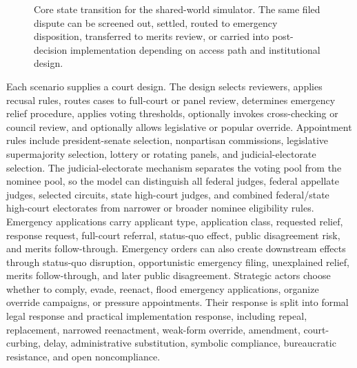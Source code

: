 \documentclass[
    journal=jlc,
    manuscript=research-article,
    year=2026,
  ]{cup-journal}
\providecommand{\Description}[1]{}
\begin{document}
\begin{figure}[hbt!]
\centering
{}
\caption{Core state transition for the shared-world simulator. The same filed dispute can be screened out, settled, routed to emergency disposition, transferred to merits review, or carried into post-decision implementation depending on access path and institutional design.}
\Description{Flow diagram showing filed dispute, access path, admission screen, emergency or merits route, decision, formal response, practical implementation, and compliance/conflict/legitimacy outputs.}
\label{fig:model-flow}
\end{figure}

Each scenario supplies a court design. The design selects reviewers, applies recusal rules, routes cases to full-court or panel review, determines emergency relief procedure, applies voting thresholds, optionally invokes cross-checking or council review, and optionally allows legislative or popular override. Appointment rules include president-senate selection, nonpartisan commissions, legislative supermajority selection, lottery or rotating panels, and judicial-electorate selection. The judicial-electorate mechanism separates the voting pool from the nominee pool, so the model can distinguish all federal judges, federal appellate judges, selected circuits, state high-court judges, and combined federal/state high-court electorates from narrower or broader nominee eligibility rules. Emergency applications carry applicant type, application class, requested relief, response request, full-court referral, status-quo effect, public disagreement risk, and merits follow-through. Emergency orders can also create downstream effects through status-quo disruption, opportunistic emergency filing, unexplained relief, merits follow-through, and later public disagreement. Strategic actors choose whether to comply, evade, reenact, flood emergency applications, organize override campaigns, or pressure appointments. Their response is split into formal legal response and practical implementation response, including repeal, replacement, narrowed reenactment, weak-form override, amendment, court-curbing, delay, administrative substitution, symbolic compliance, bureaucratic resistance, and open noncompliance.
\end{document}
